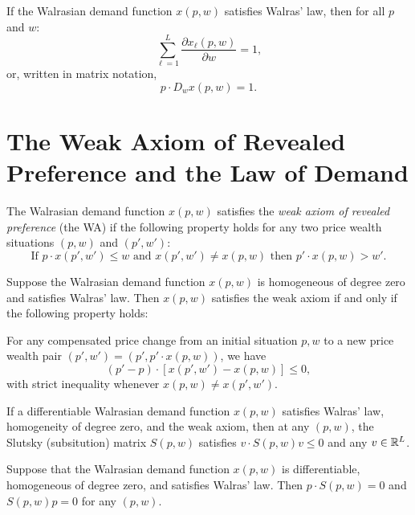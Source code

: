 \begin{prop}
    If the Walrasian demand function $x(p, w)$ satisfies Walras' law, then for all $p$ and $w$:
    \begin{equation*}
        \sum_{\ell = 1}^L \frac{\partial x_\ell (p, w)}{\partial w} = 1,
    \end{equation*}
    or, written in matrix notation,
    \begin{equation*}
        p \cdot D_w x(p, w) = 1.
    \end{equation*}
\end{prop}


\section{The Weak Axiom of Revealed Preference and the Law of Demand}

\begin{defn}
    The Walrasian demand function $x(p, w)$ satisfies the \emph{weak axiom of revealed preference} (the WA) if the following property holds for any two price wealth situations $(p, w)$ and $(p', w')$:
    \begin{equation*}
        \text{If } p \cdot x(p', w') \leq w \text{ and } x(p', w') \neq x(p, w) \text{ then } p' \cdot x(p, w) > w'.
    \end{equation*}
\end{defn}

\begin{prop}
    Suppose the Walrasian demand function $x(p, w)$ is homogeneous of degree zero and satisfies Walras' law. Then $x(p, w)$ satisfies the weak axiom if and only if the following property holds:

    For any compensated price change from an initial situation $p, w$ to a new price wealth pair $(p', w') = (p', p' \cdot x(p, w))$, we have
    \begin{equation*}
        (p' - p) \cdot [x(p', w') - x(p, w)] \leq 0,
    \end{equation*}
    with strict inequality whenever $x(p, w) \neq x(p', w')$.
\end{prop}

\begin{prop}
    If a differentiable Walrasian demand function $x(p, w)$ satisfies Walras' law, homogeneity of degree zero, and the weak axiom, then at any $(p, w)$, the Slutsky (subsitution) matrix $S(p, w)$ satisfies $v \cdot S(p, w) v \leq 0$ and any $v \in \mathbb{R}^L$.
\end{prop}

\begin{prop}
    Suppose that the Walrasian demand function $x(p, w)$ is differentiable, homogeneous of degree zero, and satisfies Walras' law. Then $p \cdot S(p, w) = 0$ and $S(p, w)p = 0$ for any $(p, w)$.
\end{prop}
